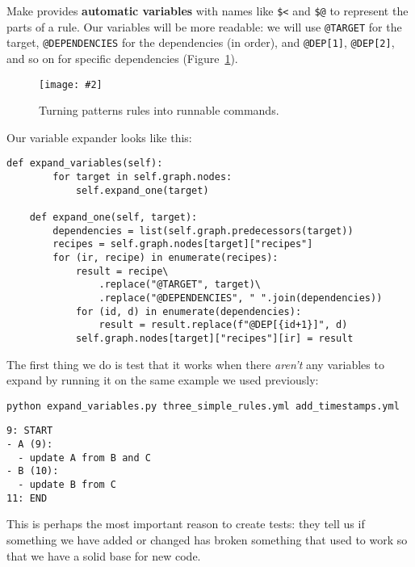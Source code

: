 \documentclass{scrbook}
\newcommand{\figref}[1]{Figure~\ref{#1}}
\newcommand{\figpdf}[4]{\begin{figure}%
\centering%
\texttt{[image: \#2]}%
\caption{#3}%
\label{#1}%
\end{figure}}
\newcommand{\glossref}[1]{\textbf{#1}}
\begin{document}
Make provides
\glossref{automatic variables}
with names like \texttt{\$<} and \texttt{\$@}
to represent the parts of a rule.
Our variables will be more readable:
we will use \texttt{@TARGET} for the target,
\texttt{@DEPENDENCIES} for the dependencies (in order),
and \texttt{@DEP[1]}, \texttt{@DEP[2]}, and so on for specific dependencies
(\figref{builder-pattern-rules}).

\figpdf{builder-pattern-rules}{./builder/pattern_rules.pdf}{Turning patterns rules into runnable commands.}{0.6}


Our variable expander looks like this:


\begin{lstlisting}[frame=single,frameround=tttt]
    def expand_variables(self):
        for target in self.graph.nodes:
            self.expand_one(target)

    def expand_one(self, target):
        dependencies = list(self.graph.predecessors(target))
        recipes = self.graph.nodes[target]["recipes"]
        for (ir, recipe) in enumerate(recipes):
            result = recipe\
                .replace("@TARGET", target)\
                .replace("@DEPENDENCIES", " ".join(dependencies))
            for (id, d) in enumerate(dependencies):
                result = result.replace(f"@DEP[{id+1}]", d)
            self.graph.nodes[target]["recipes"][ir] = result
\end{lstlisting}



The first thing we do is test that it works when there \emph{aren't} any variables to expand
by running it on the same example we used previously:


\begin{lstlisting}[frame=single,frameround=tttt]
python expand_variables.py three_simple_rules.yml add_timestamps.yml
\end{lstlisting}



\begin{lstlisting}[frame=single,frameround=tttt]
9: START
- A (9):
  - update A from B and C
- B (10):
  - update B from C
11: END
\end{lstlisting}



\noindent This is perhaps the most important reason to create tests:
they tell us if something we have added or changed
has broken something that used to work
so that we have a solid base for new code.
\end{document}
